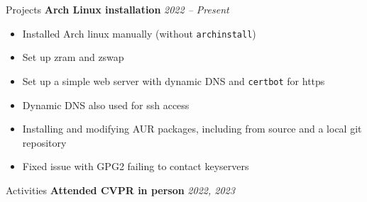 \begin{rSection}{Projects}
		{\bf Arch Linux installation}{} \hfill {\em 2022 -- Present}
		\begin{multicols}{2}
			\begin{itemize}
				\item Installed Arch linux manually (without \verb|archinstall|)
				\item Set up zram and zswap
				\item Set up a simple web server with dynamic DNS and \verb`certbot` for https
				\item Dynamic DNS also used for ssh access
				\item Installing and modifying AUR packages, including from source and a local git repository
				\item Fixed issue with GPG2 failing to contact keyservers
			\end{itemize}
		\end{multicols}
		
	\end{rSection}
	
	\begin{rSection}{Activities}
		{\bf Attended CVPR in person} \hfill {\em 2022, 2023}
	\end{rSection}
	
